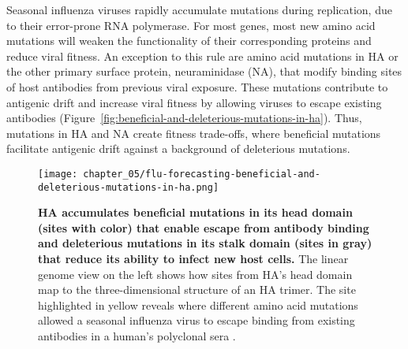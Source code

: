 Seasonal influenza viruses rapidly accumulate mutations during replication, due to their error-prone RNA polymerase.
For most genes, most new amino acid mutations will weaken the functionality of their corresponding proteins and reduce viral fitness.
An exception to this rule are amino acid mutations in HA or the other primary surface protein, neuraminidase (NA), that modify binding sites of host antibodies from previous viral exposure.
These mutations contribute to antigenic drift and increase viral fitness by allowing viruses to escape existing antibodies (Figure~\ref{fig:beneficial-and-deleterious-mutations-in-ha}).
Thus, mutations in HA and NA create fitness trade-offs, where beneficial mutations facilitate antigenic drift against a background of deleterious mutations.

\begin{figure}
  \centering
  \texttt{[image: chapter\_05/flu-forecasting-beneficial-and-deleterious-mutations-in-ha.png]}
  \caption[{HA accumulates beneficial mutations in its head domain and deleterious mutations in its stalk domain.}]{{\bf HA accumulates beneficial mutations in its head domain (sites with color) that enable escape from antibody binding and deleterious mutations in its stalk domain (sites in gray) that reduce its ability to infect new host cells.}
    The linear genome view on the left shows how sites from HA's head domain map to the three-dimensional structure of an HA trimer.
    The site highlighted in yellow reveals where different amino acid mutations allowed a seasonal influenza virus to escape binding from existing antibodies in a human's polyclonal sera \citep{Lee2019}.
}
\end{figure}

